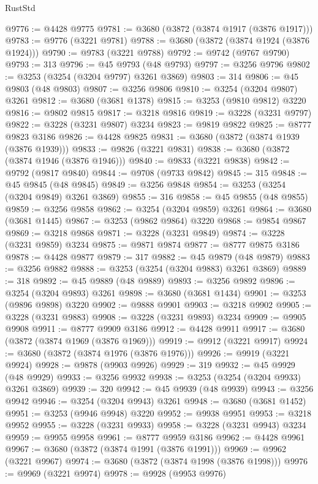 \begin{lexlean}{RustStd}
\begin{coremodule}
@9776 := @4428 @9775
@9781 := @3680 (@3872 (@3874 @1917 (@3876 @1917)))
@9783 := @9776 (@3221 @9781)
@9788 := @3680 (@3872 (@3874 @1924 (@3876 @1924)))
@9790 := @9783 (@3221 @9788)
@9792 := @9742 (@9767 @9790)
@9793 := 313
@9796 := @45 @9793 (@48 @9793)
@9797 := @3256 @9796
@9802 := @3253 (@3254 (@3204 @9797) @3261 @3869)
@9803 := 314
@9806 := @45 @9803 (@48 @9803)
@9807 := @3256 @9806
@9810 := @3254 (@3204 @9807) @3261
@9812 := @3680 (@3681 @1378)
@9815 := @3253 (@9810 @9812) @3220
@9816 := @9802 @9815
@9817 := @3218 @9816
@9819 := @3228 (@3231 @9797)
@9822 := @3228 (@3231 @9807) @3234
@9823 := @9819 @9822
@9825 := @8777 @9823 @3186
@9826 := @4428 @9825
@9831 := @3680 (@3872 (@3874 @1939 (@3876 @1939)))
@9833 := @9826 (@3221 @9831)
@9838 := @3680 (@3872 (@3874 @1946 (@3876 @1946)))
@9840 := @9833 (@3221 @9838)
@9842 := @9792 (@9817 @9840)
@9844 := @9708 (@9733 @9842)
@9845 := 315
@9848 := @45 @9845 (@48 @9845)
@9849 := @3256 @9848
@9854 := @3253 (@3254 (@3204 @9849) @3261 @3869)
@9855 := 316
@9858 := @45 @9855 (@48 @9855)
@9859 := @3256 @9858
@9862 := @3254 (@3204 @9859) @3261
@9864 := @3680 (@3681 @1445)
@9867 := @3253 (@9862 @9864) @3220
@9868 := @9854 @9867
@9869 := @3218 @9868
@9871 := @3228 (@3231 @9849)
@9874 := @3228 (@3231 @9859) @3234
@9875 := @9871 @9874
@9877 := @8777 @9875 @3186
@9878 := @4428 @9877
@9879 := 317
@9882 := @45 @9879 (@48 @9879)
@9883 := @3256 @9882
@9888 := @3253 (@3254 (@3204 @9883) @3261 @3869)
@9889 := 318
@9892 := @45 @9889 (@48 @9889)
@9893 := @3256 @9892
@9896 := @3254 (@3204 @9893) @3261
@9898 := @3680 (@3681 @1434)
@9901 := @3253 (@9896 @9898) @3220
@9902 := @9888 @9901
@9903 := @3218 @9902
@9905 := @3228 (@3231 @9883)
@9908 := @3228 (@3231 @9893) @3234
@9909 := @9905 @9908
@9911 := @8777 @9909 @3186
@9912 := @4428 @9911
@9917 := @3680 (@3872 (@3874 @1969 (@3876 @1969)))
@9919 := @9912 (@3221 @9917)
@9924 := @3680 (@3872 (@3874 @1976 (@3876 @1976)))
@9926 := @9919 (@3221 @9924)
@9928 := @9878 (@9903 @9926)
@9929 := 319
@9932 := @45 @9929 (@48 @9929)
@9933 := @3256 @9932
@9938 := @3253 (@3254 (@3204 @9933) @3261 @3869)
@9939 := 320
@9942 := @45 @9939 (@48 @9939)
@9943 := @3256 @9942
@9946 := @3254 (@3204 @9943) @3261
@9948 := @3680 (@3681 @1452)
@9951 := @3253 (@9946 @9948) @3220
@9952 := @9938 @9951
@9953 := @3218 @9952
@9955 := @3228 (@3231 @9933)
@9958 := @3228 (@3231 @9943) @3234
@9959 := @9955 @9958
@9961 := @8777 @9959 @3186
@9962 := @4428 @9961
@9967 := @3680 (@3872 (@3874 @1991 (@3876 @1991)))
@9969 := @9962 (@3221 @9967)
@9974 := @3680 (@3872 (@3874 @1998 (@3876 @1998)))
@9976 := @9969 (@3221 @9974)
@9978 := @9928 (@9953 @9976)

\end{coremodule}
\end{lexlean}
